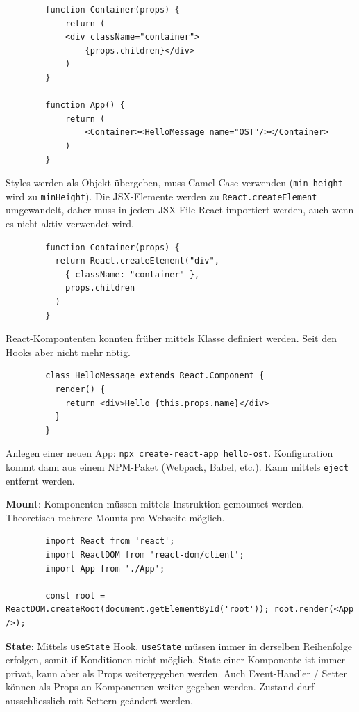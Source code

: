 \documentclass[10pt,landscape]{article}
\begin{document}
\begin{multicols}{3}
        \begin{lstlisting}
        function Container(props) {
            return (
            <div className="container">
                {props.children}</div>
            )
        }

        function App() {
            return (
                <Container><HelloMessage name="OST"/></Container>
            )
        }
        \end{lstlisting}

        Styles werden als Objekt übergeben, muss Camel Case verwenden (\lstinline{min-height} wird zu \lstinline{minHeight}).
        Die JSX-Elemente werden zu \lstinline{React.createElement} umgewandelt, daher muss in jedem JSX-File React importiert werden, auch wenn es nicht aktiv verwendet wird.

        \begin{lstlisting}
        function Container(props) {
          return React.createElement("div",
            { className: "container" },
            props.children
          )
        }
        \end{lstlisting}

        React-Kompontenten konnten früher mittels Klasse definiert werden.
        Seit den Hooks aber nicht mehr nötig.

        \begin{lstlisting}
        class HelloMessage extends React.Component {
          render() {
            return <div>Hello {this.props.name}</div>
          }
        }
        \end{lstlisting}

        Anlegen einer neuen App: \lstinline{npx create-react-app hello-ost}.
        Konfiguration kommt dann aus einem NPM-Paket (Webpack, Babel, etc.).
        Kann mittels \lstinline{eject} entfernt werden.

        \textbf{Mount}: Komponenten müssen mittels Instruktion gemountet werden.
        Theoretisch mehrere Mounts pro Webseite möglich.

        \begin{lstlisting}
        import React from 'react';
        import ReactDOM from 'react-dom/client';
        import App from './App';

        const root = ReactDOM.createRoot(document.getElementById('root')); root.render(<App />);
        \end{lstlisting}

        \textbf{State}: Mittels \lstinline{useState} Hook.
        \lstinline{useState} müssen immer in derselben Reihenfolge erfolgen, somit if-Konditionen nicht möglich.
        State einer Komponente ist immer privat, kann aber als Props weitergegeben werden.
        Auch Event-Handler / Setter können als Props an Komponenten weiter gegeben werden.
        Zustand darf ausschliesslich mit Settern geändert werden.


\end{multicols}
\end{document}
